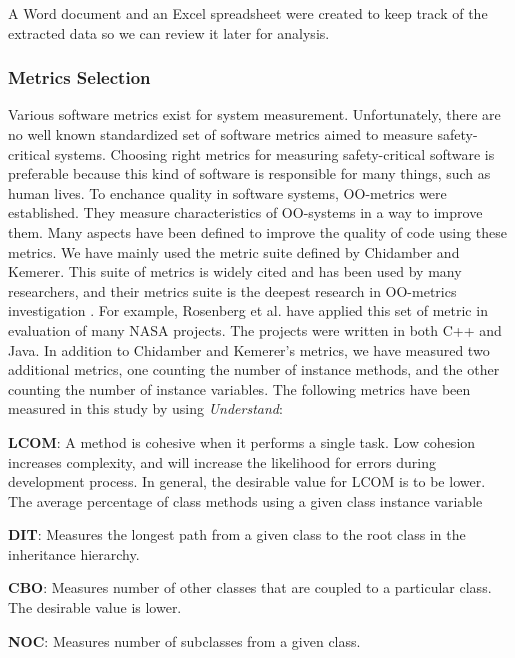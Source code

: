 A Word document and an Excel spreadsheet were created to keep track of the extracted data so we can review it later for analysis. 


\subsubsection{Metrics Selection}
Various software metrics exist for system measurement. Unfortunately, there are no well known standardized set of software metrics aimed to measure safety-critical systems. Choosing right metrics for measuring safety-critical software is preferable because this kind of software is responsible for many things, such as human lives. To enchance quality in software systems, OO-metrics were established. They measure characteristics of OO-systems in a way to improve them. Many aspects have been defined to improve the quality of code using these metrics. We have mainly used the metric suite defined by Chidamber and Kemerer\cite{chidamber1994metrics}. This suite of metrics is widely cited and has been used by many researchers, and their metrics suite is the deepest research in OO-metrics investigation . For example, Rosenberg et al.\cite{rosenberg1999risk} have applied this set of metric in evaluation of many NASA projects. The projects were written in both C++ and Java. In addition to Chidamber and Kemerer's metrics, we have measured two additional metrics, one counting the number of instance methods, and the other counting the number of instance variables. The following metrics have been measured in this study by using \textit{Understand}:


\textbf{LCOM}: A method is cohesive when it performs a single task. Low cohesion increases complexity, and will increase the likelihood for errors during development process. In general, the desirable value for LCOM is to be lower. The average percentage of class methods using a given class instance variable

\textbf{DIT}: Measures the longest path from a given class to the root class in the inheritance hierarchy.

\textbf{CBO}: Measures number of other classes that are coupled to a particular class. The desirable value is lower. 

\textbf{NOC}: Measures number of subclasses from a given class.

